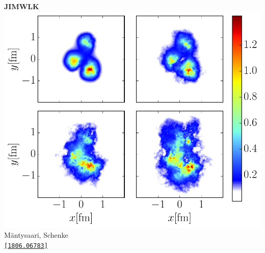 \documentclass[aspectratio=169,11pt,usenames,dvipsnames]{beamer}
\begin{document}
\begin{frame}
\begin{columns}[onlytextwidth,c]
                \begin{center}
                    {\scriptsize\bfseries JIMWLK}
                    \\[1pt]
                    \includegraphics[width=0.7\columnwidth]{images/density_mv_fluct_crop.pdf}
                    \\[-6pt]
                    {\tiny Mäntysaari, Schenke} \\ \tiny \href{https://arxiv.org/abs/1806.06783}{\color{blue}\texttt{[1806.06783]}\scalebox{.6}{$^\text{\tiny\faExternalLink}$}}
                \end{center}
        \end{columns}  
\end{frame}


\end{document}
